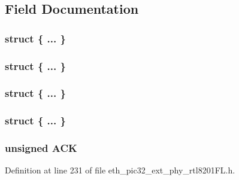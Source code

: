 \subsection{Field Documentation}
\hypertarget{union_____a_n_l_p_a_d_n_pbits__t_aeae918152c6fb16ef7bd807eb6fd09cf}{}\subsubsection[{"@124}]{\setlength{\rightskip}{0pt plus 5cm}struct \{ ... \} }\label{union_____a_n_l_p_a_d_n_pbits__t_aeae918152c6fb16ef7bd807eb6fd09cf}
\hypertarget{union_____a_n_l_p_a_d_n_pbits__t_a2e686f8f9e7e64c3d740ac281019d621}{}\subsubsection[{"@126}]{\setlength{\rightskip}{0pt plus 5cm}struct \{ ... \} }\label{union_____a_n_l_p_a_d_n_pbits__t_a2e686f8f9e7e64c3d740ac281019d621}
\hypertarget{union_____a_n_l_p_a_d_n_pbits__t_a30a9fb674decfad51f5e091da52959a0}{}\subsubsection[{"@196}]{\setlength{\rightskip}{0pt plus 5cm}struct \{ ... \} }\label{union_____a_n_l_p_a_d_n_pbits__t_a30a9fb674decfad51f5e091da52959a0}
\hypertarget{union_____a_n_l_p_a_d_n_pbits__t_ada927702cfd1eec33a47e05dfc6c1984}{}\subsubsection[{"@198}]{\setlength{\rightskip}{0pt plus 5cm}struct \{ ... \} }\label{union_____a_n_l_p_a_d_n_pbits__t_ada927702cfd1eec33a47e05dfc6c1984}
\hypertarget{union_____a_n_l_p_a_d_n_pbits__t_a9d5913829bb2b681dc6257fc7e9b7a56}{}
\subsubsection[{A\+C\+K}]{\setlength{\rightskip}{0pt plus 5cm}unsigned A\+C\+K}\label{union_____a_n_l_p_a_d_n_pbits__t_a9d5913829bb2b681dc6257fc7e9b7a56}


Definition at line 231 of file eth\+\_\+pic32\+\_\+ext\+\_\+phy\+\_\+rtl8201\+F\+L.\+h.

\hypertarget{union_____a_n_l_p_a_d_n_pbits__t_a04eefaff71d440a3996c7db3676475ba}{}
